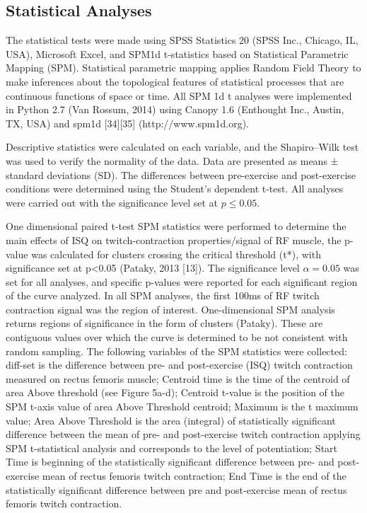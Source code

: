 \documentclass[utf8]{style/FrontiersinHarvard}
\begin{document}
\subsection{Statistical Analyses}
The statistical tests were made using SPSS Statistics 20 (SPSS Inc., Chicago, IL, USA), Microsoft Excel, and SPM1d t-statistics based on Statistical Parametric Mapping (SPM).
Statistical parametric mapping applies Random Field Theory to make inferences about the topological features of statistical processes that are continuous functions of space or time.
All SPM 1d t analyses were implemented in Python 2.7 (Van Rossum, 2014) using Canopy 1.6 (Enthought Inc., Austin, TX, USA) and spm1d [34][35] (http://www.spm1d.org).

Descriptive statistics were calculated on each variable, and the Shapiro–Wilk test was used to verify the normality of the data.
Data are presented as means ± standard deviations (SD).
The differences between pre-exercise and post-exercise conditions were determined using the Student’s dependent t-test.
All analyses were carried out with the significance level set at $ p \leq 0.05 $.

One dimensional paired t-test SPM statistics were performed to determine the main effects of ISQ on twitch-contraction properties/signal of RF muscle, the p-value was calculated for clusters crossing the critical threshold (t*), with significance set at p<0.05 (Pataky, 2013 [13]).
The significance level $ \alpha = 0.05 $ was set for all analyses, and specific p-values were reported for each significant region of the curve analyzed. In all SPM analyses, the first 100ms of RF twitch contraction signal was the region of interest.
One-dimensional SPM analysis returns regions of significance in the form of clusters (Pataky).
These are contiguous values over which the curve is determined to be not consistent with random sampling.
The following variables of the SPM statistics were collected: diff-set is the difference between pre- and post-exercise (ISQ) twitch contraction measured on rectus femoris muscle;
Centroid time is the time of the centroid of area Above threshold (see Figure 5a-d);
Centroid t-value is the position of the SPM t-axis value of area Above Threshold centroid;
Maximum is the t maximum value;
Area Above Threshold is the area (integral) of statistically significant difference between the mean of pre- and post-exercise twitch contraction applying SPM t-statistical analysis and corresponds to the level of potentiation;
Start Time is beginning of the statistically significant difference between pre- and post-exercise mean of rectus femoris twitch contraction;
End Time is the end of the statistically significant difference between pre and post-exercise mean of rectus femoris twitch contraction.
\end{document}
